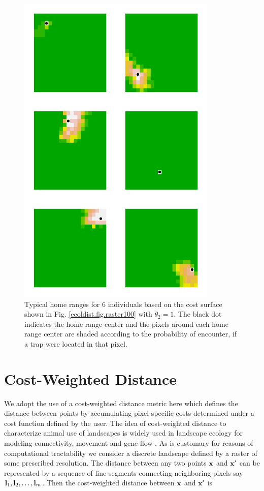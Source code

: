 \documentclass[12pt]{article}
\begin{document}
\begin{spacing}{1.8}
\begin{figure}
\begin{center}
\includegraphics[height=6in,width=3.75in]{figs/home_ranges}
\end{center}
\caption{
Typical home ranges for 6 individuals based on the cost surface shown in
  Fig. \ref{ecoldist.fig.raster100} with $\theta_{2}=1$. The black dot indicates the home
  range center and the pixels around each home range center are shaded
according to the probability of encounter, if a trap were located in
that pixel. 
}
\label{fig.homeranges}
\end{figure}


\section{Cost-Weighted Distance}

We adopt the use of a cost-weighted distance metric here which defines
the distance between points by accumulating pixel-specific costs
determined under a cost function defined by the user.  The idea of
cost-weighted distance to characterize animal use of landscapes is
widely used in landscape ecology for modeling connectivity, movement
and gene flow \citep{beier_etal:2008}. As is customary for reasons of
computational tractability we consider a discrete landscape defined by
a raster of some prescribed resolution. The distance between any two
points ${\bf x}$ and ${\bf x}'$ can be represented by a sequence of
line segments connecting neighboring pixels say ${\bf l}_{1},{\bf
  l}_{2},\ldots,{\bf l}_{m}$. Then the cost-weighted distance between
${\bf x}$ and ${\bf x}'$ is


\end{spacing}
\end{document}
